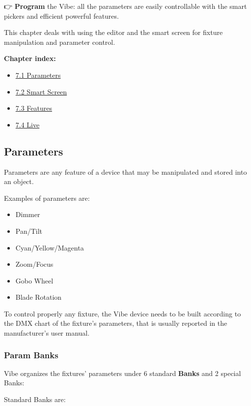 \documentclass[
]{article}
\providecommand{\tightlist}{%
  \setlength{\itemsep}{0pt}\setlength{\parskip}{0pt}}
\begin{document}
👉 \textbf{Program} the Vibe: all the parameters are easily controllable with the smart pickers and efficient powerful features.

This chapter deals with using the editor and the smart screen for fixture manipulation and parameter control.

\textbf{Chapter index:}

\begin{itemize}
\tightlist
\item
  \protect\hyperlink{Parameters-7.1}{7.1 Parameters}
\item
  \protect\hyperlink{Smart-Screen-7.2}{7.2 Smart Screen}
\item
  \protect\hyperlink{Editor-Features-7.3}{7.3 Features}
\item
  \protect\hyperlink{Live-7.4}{7.4 Live}
\end{itemize}

\hypertarget{Parameters-7.1}{%
\subsection{Parameters}\label{Parameters-7.1}}

Parameters are any feature of a device that may be manipulated and stored into an object.

Examples of parameters are:

\begin{itemize}
\item
  Dimmer
\item
  Pan/Tilt
\item
  Cyan/Yellow/Magenta
\item
  Zoom/Focus
\item
  Gobo Wheel
\item
  Blade Rotation
\end{itemize}

To control properly any fixture, the Vibe device needs to be built according to the DMX chart of the fixture's parameters, that is usually reported in the manufacturer's user manual.

\hypertarget{param-banks}{%
\subsubsection{Param Banks}\label{param-banks}}

Vibe organizes the fixtures' parameters under 6 standard \textbf{Banks} and 2 special Banks:

Standard Banks are:
\end{document}
